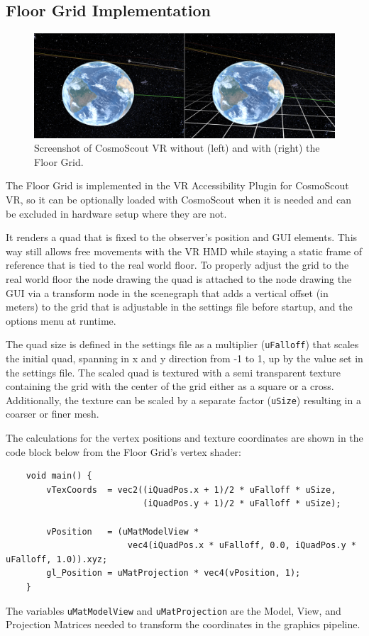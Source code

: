 \subsection{Floor Grid Implementation}\label{subsec:floor-grid-implementation}

\begin{figure}[h]
    \centering
    \includegraphics[width=\textwidth]{content/4_1_floorGrid/img/FloorGrid_Screenshot}
    \caption{Screenshot of CosmoScout VR without (left) and with (right) the Floor Grid.}
    \label{fig:floor-grid-screenshot}
\end{figure}

The Floor Grid is implemented in the VR Accessibility Plugin for CosmoScout VR, so it can be optionally loaded with
CosmoScout when it is needed and can be excluded in hardware setup where they are not.

It renders a quad that is fixed to the observer's position and GUI elements.
This way still allows free movements with the VR HMD while staying a static frame of reference that is tied to
the real world floor.
To properly adjust the grid to the real world floor the node drawing the quad is attached to the node drawing the GUI
via a transform node in the scenegraph that adds a vertical offset (in meters) to the grid that is adjustable in the
settings file before startup, and the options menu at runtime.

The quad size is defined in the settings file as a multiplier (\texttt{uFalloff}) that scales
the initial quad, spanning in x and y direction from -1 to 1, up by the value set in the settings file.
The scaled quad is textured with a semi transparent texture containing the grid with the center of the grid either as a
square or a cross.
Additionally, the texture can be scaled by a separate factor (\texttt{uSize}) resulting in a
coarser or finer mesh.

The calculations for the vertex positions and texture coordinates are shown in the code block below from the Floor
Grid's vertex shader:
\begin{verbatim}
    void main() {
        vTexCoords  = vec2((iQuadPos.x + 1)/2 * uFalloff * uSize,
                           (iQuadPos.y + 1)/2 * uFalloff * uSize);

        vPosition   = (uMatModelView *
                        vec4(iQuadPos.x * uFalloff, 0.0, iQuadPos.y * uFalloff, 1.0)).xyz;
        gl_Position = uMatProjection * vec4(vPosition, 1);
    }
\end{verbatim}
The variables \texttt{uMatModelView} and \texttt{uMatProjection} are the Model, View, and Projection
Matrices needed to transform the coordinates in the graphics pipeline.

